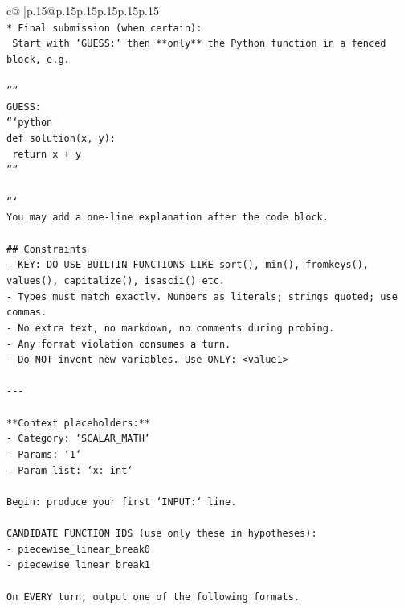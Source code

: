 \documentclass{article}
\begin{document}
{\begin{supertabular}{c@{$\;$}|p{.15\linewidth}@{}p{.15\linewidth}p{.15\linewidth}p{.15\linewidth}p{.15\linewidth}p{.15\linewidth}}
{{{\\ 
\texttt{* Final submission (when certain):} \\
\texttt{  Start with `GUESS:` then **only** the Python function in a fenced block, e.g.} \\
\\ 
\texttt{````} \\
\texttt{GUESS:} \\
\texttt{```python} \\
\texttt{def solution(x, y):} \\
\texttt{    return x + y} \\
\texttt{````} \\
\\ 
\texttt{```} \\
\texttt{You may add a one{-}line explanation after the code block.} \\
\\ 
\texttt{\#\# Constraints} \\
\texttt{{-} KEY: DO USE BUILTIN FUNCTIONS LIKE sort(), min(), fromkeys(), values(), capitalize(), isascii() etc.} \\
\texttt{{-} Types must match exactly. Numbers as literals; strings quoted; use commas.} \\
\texttt{{-} No extra text, no markdown, no comments during probing.} \\
\texttt{{-} Any format violation consumes a turn.} \\
\texttt{{-} Do NOT invent new variables. Use ONLY: <value1>} \\
\\ 
\texttt{{-}{-}{-}} \\
\\ 
\texttt{**Context placeholders:**} \\
\texttt{{-} Category: `SCALAR\_MATH`} \\
\texttt{{-} Params: `1`} \\
\texttt{{-} Param list: `x: int`} \\
\\ 
\texttt{Begin: produce your first `INPUT:` line.} \\
\\ 
\texttt{CANDIDATE FUNCTION IDS (use only these in hypotheses):} \\
\texttt{{-} piecewise\_linear\_break0} \\
\texttt{{-} piecewise\_linear\_break1} \\
\\ 
\texttt{On EVERY turn, output one of the following formats.} \\
}}}
\end{supertabular}}
\end{document}
